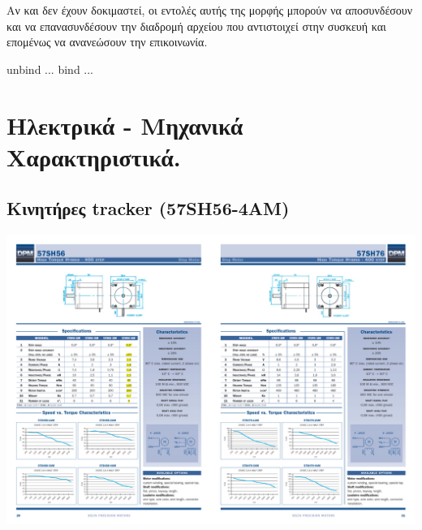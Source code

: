 \documentclass[
  a4paper,
  twoside,
  titlepage,
  12pt]{article}
\newenvironment{Shaded}{\begin{snugshade}}{\end{snugshade}}
\newcommand{\BuiltInTok}[1]{#1}
\newcommand{\ExtensionTok}[1]{#1}
\newcommand{\NormalTok}[1]{#1}
\numberwithin{equation}{section}
\numberwithin{figure}{section}
\numberwithin{table}{section}
\begin{document}
Αν και δεν έχουν δοκιμαστεί, οι εντολές αυτής της μορφής μπορούν να αποσυνδέσουν και να επανασυνδέσουν την διαδρομή αρχείου που αντιστοιχεί στην συσκευή και επομένως να ανανεώσουν την επικοινωνία.

\begin{Shaded}
\begin{Highlighting}[]
\ExtensionTok{unbind}\NormalTok{ ...}
\BuiltInTok{bind}\NormalTok{   ...}
\end{Highlighting}
\end{Shaded}

\hypertarget{ux3b7ux3bbux3b5ux3baux3c4ux3c1ux3b9ux3baux3ac---ux3bcux3b7ux3c7ux3b1ux3bdux3b9ux3baux3ac-ux3c7ux3b1ux3c1ux3b1ux3baux3c4ux3b7ux3c1ux3b9ux3c3ux3c4ux3b9ux3baux3ac.}{%
\section{Ηλεκτρικά - Μηχανικά Χαρακτηριστικά.}\label{ux3b7ux3bbux3b5ux3baux3c4ux3c1ux3b9ux3baux3ac---ux3bcux3b7ux3c7ux3b1ux3bdux3b9ux3baux3ac-ux3c7ux3b1ux3c1ux3b1ux3baux3c4ux3b7ux3c1ux3b9ux3c3ux3c4ux3b9ux3baux3ac.}}

\hypertarget{ux3baux3b9ux3bdux3b7ux3c4ux3aeux3c1ux3b5ux3c2-tracker-57sh56-4am}{%
\subsection{Κινητήρες tracker (57SH56-4AM)}\label{ux3baux3b9ux3bdux3b7ux3c4ux3aeux3c1ux3b5ux3c2-tracker-57sh56-4am}}

\begin{center}\includegraphics[width=.94\linewidth]{./files/57SH56-4AM_400_STEP} \end{center}
\end{document}
